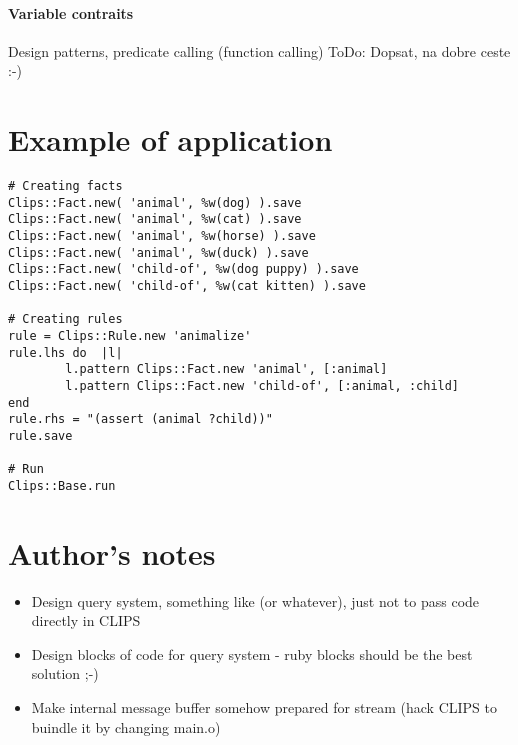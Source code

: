 \documentclass[a4paper,10pt]{article}
\begin{document}
\paragraph{Variable contraits}
Design  patterns, predicate calling (function calling)
ToDo: Dopsat, na dobre ceste :-)

\section{Example of application}
\begin{verbatim}
# Creating facts
Clips::Fact.new( 'animal', %w(dog) ).save
Clips::Fact.new( 'animal', %w(cat) ).save
Clips::Fact.new( 'animal', %w(horse) ).save
Clips::Fact.new( 'animal', %w(duck) ).save
Clips::Fact.new( 'child-of', %w(dog puppy) ).save
Clips::Fact.new( 'child-of', %w(cat kitten) ).save

# Creating rules
rule = Clips::Rule.new 'animalize'
rule.lhs do  |l|
        l.pattern Clips::Fact.new 'animal', [:animal]
        l.pattern Clips::Fact.new 'child-of', [:animal, :child]
end
rule.rhs = "(assert (animal ?child))"
rule.save

# Run
Clips::Base.run\end{verbatim}

\section{Author's notes}
\begin{itemize}
 \item Design query system, something like (or whatever), just not to pass code directly in CLIPS
 \item Design blocks of code for query system - ruby blocks should be the best solution ;-)
 \item Make internal message buffer somehow prepared for stream (hack CLIPS to buindle it by changing main.o)
\end{itemize}
\end{document}

